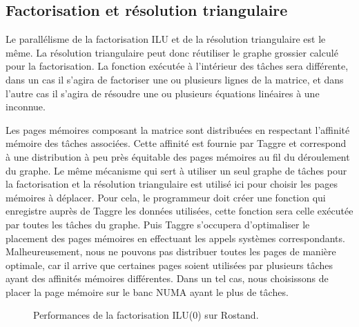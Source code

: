 \subsection{Factorisation et résolution triangulaire}
Le parallélisme de la factorisation ILU et de la résolution triangulaire est le même.
%
La résolution triangulaire peut donc réutiliser le graphe grossier calculé pour la factorisation.
%
La fonction exécutée à l'intérieur des tâches sera différente, dans un cas il s'agira de factoriser une ou plusieurs lignes de la matrice, et dans l'autre cas il s'agira de résoudre une ou plusieurs équations linéaires à une inconnue.



Les pages mémoires composant la matrice sont distribuées en respectant l'affinité mémoire des tâches associées.
%
Cette affinité est fournie par Taggre et correspond à une distribution à peu près équitable des pages mémoires au fil du déroulement du graphe.
%
Le même mécanisme qui sert à utiliser un seul graphe de tâches pour la factorisation et la résolution triangulaire est utilisé ici pour choisir les pages mémoires à déplacer.
%
Pour cela, le programmeur doit créer une fonction qui enregistre auprès de Taggre les données utilisées, cette fonction sera celle exécutée par toutes les tâches du graphe.
%
Puis Taggre s'occupera d'optimaliser le placement des pages mémoires en effectuant les appels systèmes correspondants.
%
Malheureusement, nous ne pouvons pas distribuer toutes les pages de manière optimale, car il arrive que certaines pages soient utilisées par plusieurs tâches ayant des affinités mémoires différentes.
%
Dans un tel cas, nous choisissons de placer la page mémoire sur le banc NUMA ayant le plus de tâches.



\begin{figure}[!h]
     \begin{center}
    \end{center}
    \caption{Performances de la factorisation ILU(0) sur Rostand.}
\end{figure}

